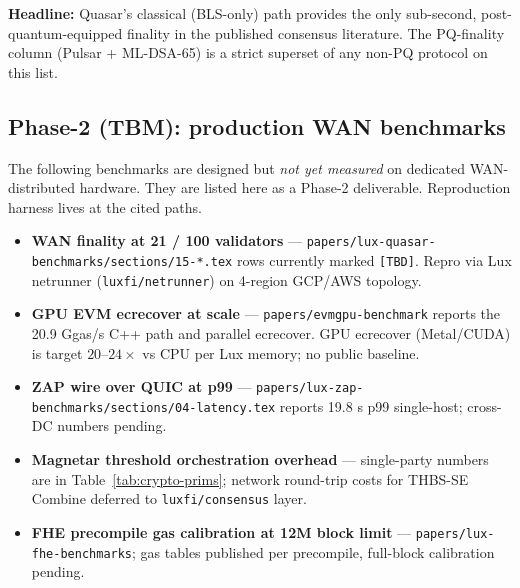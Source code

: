 \noindent\textbf{Headline:} Quasar's classical (BLS-only) path provides
the only sub-second, post-quantum-equipped finality in the published
consensus literature. The PQ-finality column (Pulsar + ML-DSA-65) is a
strict superset of any non-PQ protocol on this list.

\subsection{Phase-2 (TBM): production WAN benchmarks}

The following benchmarks are designed but \emph{not yet measured} on
dedicated WAN-distributed hardware. They are listed here as a Phase-2
deliverable. Reproduction harness lives at the cited paths.

\begin{itemize}[leftmargin=1.4em,topsep=0.2em,itemsep=0.1em]
  \item \textbf{WAN finality at 21 / 100 validators} ---
        \texttt{papers/lux-quasar-benchmarks/sections/15-*.tex}
        rows currently marked \texttt{[TBD]}. Repro via Lux netrunner
        (\texttt{luxfi/netrunner}) on 4-region GCP/AWS topology.
  \item \textbf{GPU EVM ecrecover at scale} ---
        \texttt{papers/evmgpu-benchmark} reports the 20.9 Ggas/s C++
        path and parallel ecrecover. GPU ecrecover (Metal/CUDA) is
        target $20$--$24\times$ vs CPU per Lux memory; no public
        baseline.
  \item \textbf{ZAP wire over QUIC at p99} ---
        \texttt{papers/lux-zap-benchmarks/sections/04-latency.tex}
        reports 19.8 \textmu s p99 single-host; cross-DC numbers
        pending.
  \item \textbf{Magnetar threshold orchestration overhead} ---
        single-party numbers are in Table~\ref{tab:crypto-prims};
        network round-trip costs for THBS-SE Combine deferred to
        \texttt{luxfi/consensus} layer.
  \item \textbf{FHE precompile gas calibration at 12M block limit} ---
        \texttt{papers/lux-fhe-benchmarks}; gas tables published per
        precompile, full-block calibration pending.
\end{itemize}
